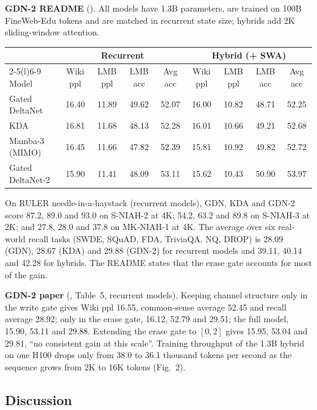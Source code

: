 \begin{results}
\textbf{GDN-2 README} (). All models have 1.3B
parameters, are trained on 100B FineWeb-Edu tokens and are matched in recurrent state size;
hybrids add 2K sliding-window attention.
\begin{center}\footnotesize\setlength{\tabcolsep}{4pt}
\begin{tabular}{@{}lcccc@{\hspace{1em}}cccc@{}}
\toprule
 & \multicolumn{4}{c}{Recurrent} & \multicolumn{4}{c}{Hybrid (+ SWA)}\\
\cmidrule(lr){2-5}\cmidrule(l){6-9}
Model & Wiki ppl & LMB ppl & LMB acc & Avg acc & Wiki ppl & LMB ppl & LMB acc & Avg acc\\
\midrule
Gated DeltaNet & 16.40 & 11.89 & 49.62 & 52.07 & 16.00 & 10.82 & 48.71 & 52.25\\
KDA & 16.81 & 11.68 & 48.13 & 52.28 & 16.01 & 10.66 & 49.21 & 52.68\\
Mamba-3 (MIMO) & 16.45 & 11.66 & 47.82 & 52.39 & 15.81 & 10.92 & 49.82 & 52.72\\
Gated DeltaNet-2 & 15.90 & 11.41 & 48.09 & 53.11 & 15.62 & 10.43 & 50.90 & 53.97\\
\bottomrule
\end{tabular}
\end{center}
On RULER needle-in-a-haystack (recurrent models), GDN, KDA and GDN-2 score 87.2, 89.0 and 93.0 on
S-NIAH-2 at 4K; 54.2, 63.2 and 89.8 on S-NIAH-3 at 2K; and 27.8, 28.0 and 37.8 on MK-NIAH-1 at 4K.
The average over six real-world recall tasks (SWDE, SQuAD, FDA, TriviaQA, NQ, DROP) is 28.09 (GDN),
28.67 (KDA) and 29.88 (GDN-2) for recurrent models and 39.11, 40.14 and 42.28 for hybrids. The
README states that the erase gate accounts for most of the gain.

\textbf{GDN-2 paper} (, Table~5,
recurrent models). Keeping channel structure only in the write gate gives Wiki ppl 16.55, common-sense
average 52.45 and recall average 28.92; only in the erase gate, 16.12, 52.79 and 29.51; the full
model, 15.90, 53.11 and 29.88. Extending the erase gate to $[0,2]$ gives 15.95, 53.04 and 29.81,
``no consistent gain at this scale''. Training throughput of the 1.3B hybrid on one H100 drops
only from 38.0 to 36.1 thousand tokens per second as the sequence grows from 2K to 16K tokens
(Fig.~2).
\end{results}

\subsection{Discussion}

